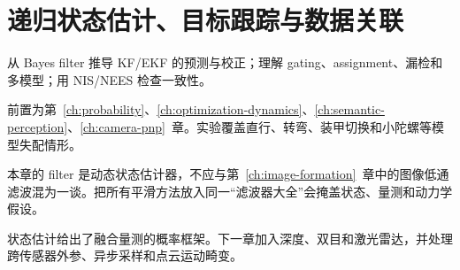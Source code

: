 \chapter{递归状态估计、目标跟踪与数据关联}
\label{ch:state-estimation}

\begin{learningobjectives}
从 Bayes filter 推导 KF/EKF 的预测与校正；理解 gating、assignment、漏检和多模型；用 NIS/NEES 检查一致性。
\end{learningobjectives}

\begin{prerequisites}
前置为第~\ref{ch:probability}、\ref{ch:optimization-dynamics}、\ref{ch:semantic-perception}、\ref{ch:camera-pnp}~章。实验覆盖直行、转弯、装甲切换和小陀螺等模型失配情形。
\end{prerequisites}


\begin{failuremode}
本章的 filter 是动态状态估计器，不应与第~\ref{ch:image-formation}~章中的图像低通滤波混为一谈。把所有平滑方法放入同一“滤波器大全”会掩盖状态、量测和动力学假设。
\end{failuremode}

\begin{chaptertransition}
状态估计给出了融合量测的概率框架。下一章加入深度、双目和激光雷达，并处理跨传感器外参、异步采样和点云运动畸变。
\end{chaptertransition}

